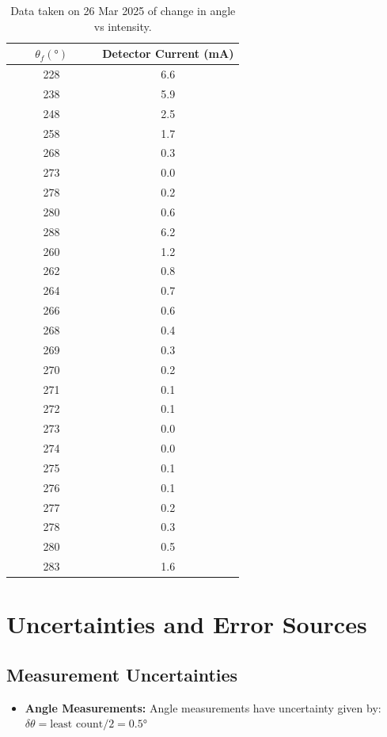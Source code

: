\documentclass[%
sor,
 jor,
 amsmath,amssymb,
 reprint,
]{revtex4-2}
\begin{document}
\begin{table}[H]
\centering
  \begin{tabular}{|c|c|}
  \hline
  $\theta_f (\si{\degree})$ & Detector Current (\si{\milli\ampere})\\
  \hline
228 & 6.6 \\
238 & 5.9 \\
248 & 2.5 \\
258 & 1.7 \\
268 & 0.3 \\
273 & 0.0 \\
278 & 0.2 \\
280 & 0.6 \\
288 & 6.2 \\
260 & 1.2 \\
262 & 0.8 \\
264 & 0.7 \\
266 & 0.6 \\
268 & 0.4 \\
269 & 0.3 \\
270 & 0.2 \\
271 & 0.1 \\
272 & 0.1 \\
273 & 0.0 \\
274 & 0.0 \\
 $\,\,\,\,\,\,\,\,\,\,\,\,\,\,\,$ 275 $\,\,\,\,\,\,\,\,\,\,\,\,\,\,\,$  & 0.1 \\
276 & 0.1 \\
277 & 0.2 \\
278 & 0.3 \\
280 & 0.5 \\
283 & 1.6 \\
\hline
  \end{tabular}
\caption{Data taken on 26 Mar 2025 of change in angle vs intensity.}
\end{table}
\section{Uncertainties and Error Sources}
\subsection{Measurement Uncertainties}
\begin{itemize}
	\item \textbf{Angle Measurements:}  Angle measurements have uncertainty given by: $\delta \theta = \text{least count}/2 = 0.5 \si{\degree} $
\end{itemize}
\end{document}
